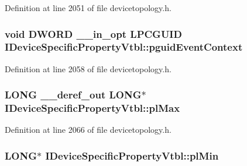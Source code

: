 Definition at line 2051 of file devicetopology.\+h.

\subsubsection[{\texorpdfstring{pguid\+Event\+Context}{pguidEventContext}}]{ {\bf void} {\bf D\+W\+O\+RD} {\bf \+\_\+\+\_\+in\+\_\+opt} {\bf L\+P\+C\+G\+U\+ID} I\+Device\+Specific\+Property\+Vtbl\+::pguid\+Event\+Context}\hypertarget{struct_i_device_specific_property_vtbl_a06fd13e918cf7dcb5c86112bcb3def73}{}\label{struct_i_device_specific_property_vtbl_a06fd13e918cf7dcb5c86112bcb3def73}


Definition at line 2058 of file devicetopology.\+h.

\subsubsection[{\texorpdfstring{pl\+Max}{plMax}}]{ L\+O\+NG {\bf \+\_\+\+\_\+deref\+\_\+out} L\+O\+NG$\ast$ I\+Device\+Specific\+Property\+Vtbl\+::pl\+Max}\hypertarget{struct_i_device_specific_property_vtbl_af91c303148d0b65907d8eebf744958d2}{}\label{struct_i_device_specific_property_vtbl_af91c303148d0b65907d8eebf744958d2}


Definition at line 2066 of file devicetopology.\+h.

\subsubsection[{\texorpdfstring{pl\+Min}{plMin}}]{ L\+O\+NG$\ast$ I\+Device\+Specific\+Property\+Vtbl\+::pl\+Min}\hypertarget{struct_i_device_specific_property_vtbl_adab19440faa003db0110d355a9cdf1b6}{}\label{struct_i_device_specific_property_vtbl_adab19440faa003db0110d355a9cdf1b6}


